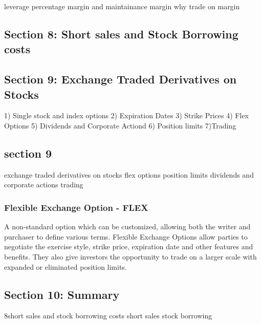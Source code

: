 leverage
percentage margin and maintainance margin
why trade on margin


\subsection*{Section 8: Short sales and Stock Borrowing costs}
\subsection*{Section 9: Exchange Traded Derivatives on Stocks} 
1) Single stock and index options
2) Expiration Dates
3) Strike Prices
4) Flex Options
5) Dividends and Corporate Actiond
6) Position limits
7)Trading

\subsection*{section 9}
exchange traded derivatives on stocks
flex options
position limits
dividends and corporate actions
trading

\subsubsection*{Flexible Exchange Option - FLEX}


 A non-standard option which can be customized, allowing both the writer and purchaser to define various terms. Flexible Exchange Options allow parties to negotiate the exercise style, strike price, expiration date and other features and benefits. They also give investors the opportunity to trade on a larger scale with expanded or eliminated position limits. 


\subsection*{Section 10: Summary}
8short sales and stock borrowing costs
short sales
stock borrowing


